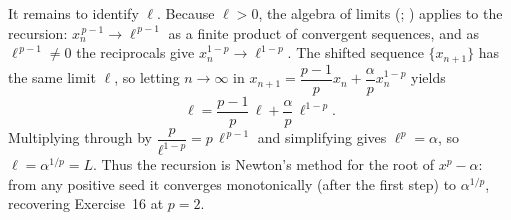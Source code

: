 \documentclass[main.tex]{subfiles}
\begin{document}
\begin{SolutionBlue}
It remains to identify $\ell$. Because $\ell>0$, the algebra of limits
(; ) applies to the
recursion: $x_{n}^{\,p-1}\to\ell^{\,p-1}$ as a finite product of convergent sequences, and as
$\ell^{\,p-1}\neq 0$ the reciprocals give $x_{n}^{1-p}\to\ell^{1-p}$. The shifted sequence $\{x_{n+1}\}$
has the same limit $\ell$, so letting $n\to\infty$ in $x_{n+1}=\dfrac{p-1}{p}x_{n}+\dfrac{\alpha}{p}x_{n}^{1-p}$
yields
\[
\ell=\frac{p-1}{p}\,\ell+\frac{\alpha}{p}\,\ell^{1-p}.
\]
Multiplying through by $\dfrac{p}{\ell^{1-p}}=p\,\ell^{\,p-1}$ and simplifying gives $\ell^{p}=\alpha$, so
$\ell=\alpha^{1/p}=L$. Thus the recursion is Newton's method for the root of $x^{p}-\alpha$: from any
positive seed it converges monotonically (after the first step) to $\alpha^{1/p}$, recovering Exercise~16
at $p=2$.
\end{SolutionBlue}
\end{document}

